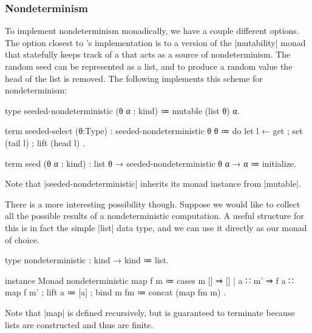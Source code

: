 \subsubsection{Nondeterminism}

To implement nondeterminism monadically, we have a couple different options.
The option closest to \LangB's implementation is to a version of the \code|mutability| monad that statefully keeps track of a  that acts as a source of nondeterminism.
The random seed can be represented as a list, and to produce a random value the head of the list is removed.
The following implements this scheme for nondeterminism:
%
\begin{snippet}
type seeded-nondeterministic (θ α : kind) ≔ mutable (list θ) α.

term seeded-select (θ:Type) : seeded-nondeterministic θ θ
  ≔ do
      { let l ← get
      ; set (tail l)
      ; lift (head l) }.

term seed (θ α : kind) : list θ → seeded-nondeterministic θ α → α
  ≔ initialize.
\end{snippet}
%
Note that \code|seeded-nondeterministic| inherits its monad instance from \code|mutable|.

There is a more interesting possibility though.
Suppose we would like to collect all the possible results of a nondeterministic computation.
A useful structure for this is in fact the simple \code|list| data type, and we can use it directly as our monad of choice.
%
\begin{program}[caption={The nondeterminisic monad}]
type nondeterministic : kind → kind ≔ list.

instance Monad nondeterministic
  { map f m   ≔ cases m
                  { [] ⇒ []
                  | a ∷ m' ⇒ f a ∷ map f m' }
  ; lift a    ≔ [a]
  ; bind m fm ≔ concat (map fm m) }.
\end{program}
%
Note that \code|map| is defined recursively, but is guaranteed to terminate because lists are constructed and thus are finite.

